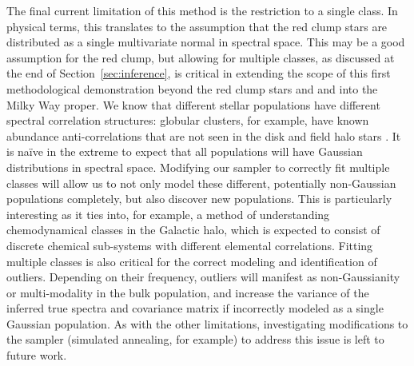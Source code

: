 \documentclass[a4paper,fleqn,usenatbib]{mnras}
\newcommand{\mkn}[1]{\textbf{\textcolor{red}{MKN: #1}}}
\begin{document}
The final current limitation of this method is the restriction to a single class. In physical terms, this translates to the assumption that the red clump stars are distributed as a single multivariate normal in spectral space. This may be a good assumption for the red clump, but allowing for multiple classes, as discussed at the end of Section~\ref{sec:inference}, is critical in extending the scope of this first methodological demonstration beyond the red clump stars and and into the Milky Way proper. We know that different stellar populations have different spectral correlation structures: globular clusters, for example, have known abundance anti-correlations that are not seen in the disk and field halo stars \citep{someone}. It is na\"ive in the extreme to expect that all populations will have Gaussian distributions in spectral space. Modifying our sampler to correctly fit multiple classes will allow us to not only model these different, potentially non-Gaussian populations completely, but also discover new populations. This is particularly interesting as it ties into, for example, a method of understanding chemodynamical classes in the Galactic halo, which is expected to consist of discrete chemical sub-systems with different elemental correlations. Fitting multiple classes is also critical for the correct modeling and identification of outliers. Depending on their frequency, outliers will manifest as non-Gaussianity or multi-modality in the bulk population, and increase the variance of the inferred true spectra and covariance matrix if incorrectly modeled as a single Gaussian population. As with the other limitations, investigating modifications to the sampler (simulated annealing, for example) to address this issue is left to future work.

 
\end{document}
